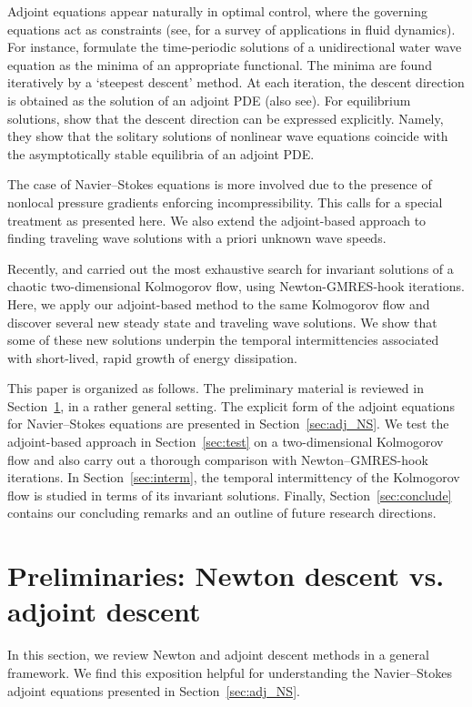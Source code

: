 \documentclass{article}
\begin{document}
Adjoint equations appear naturally in optimal control, where the governing equations
act as constraints (see, for a survey of applications in fluid dynamics). 
For instance, formulate the
time-periodic solutions of a unidirectional water wave equation
as the minima of an appropriate functional. The minima are found 
iteratively by
a `steepest descent' method.
At each iteration,
the descent direction is obtained as the solution of an adjoint PDE (also see).
For equilibrium solutions, show that the descent direction can be expressed explicitly.
Namely, they show that the solitary solutions of nonlinear wave equations coincide with the asymptotically stable equilibria of 
an adjoint PDE.

The case of
Navier--Stokes equations is more involved due to
the presence of nonlocal pressure
gradients enforcing incompressibility. This calls for a special treatment
as presented here. We also extend the adjoint-based approach to finding
traveling wave solutions with a priori unknown wave speeds.

Recently, and carried out the most exhaustive search for invariant solutions
of a chaotic two-dimensional Kolmogorov flow, using Newton-GMRES-hook iterations.
Here, we apply our adjoint-based method to the same Kolmogorov flow and discover several
new steady state and traveling wave solutions. We show that some of these new
solutions underpin the temporal intermittencies associated with
short-lived, rapid growth of energy dissipation. 

This paper is organized as follows. The preliminary material is reviewed in
Section~\ref{sec:prelim}, in a rather general setting. The explicit form of the
adjoint equations for Navier--Stokes equations are presented in
Section~\ref{sec:adj_NS}. We test the adjoint-based approach in Section~\ref{sec:test}
on a two-dimensional Kolmogorov flow
and also carry out a thorough comparison with Newton--GMRES-hook iterations.
In Section~\ref{sec:interm}, the temporal intermittency of the Kolmogorov flow is
studied in terms of its invariant solutions. Finally, Section~\ref{sec:conclude} contains
our concluding remarks and an outline of future research directions.




\section{Preliminaries: Newton descent vs. adjoint descent}\label{sec:prelim}
In this section, we review Newton and adjoint descent methods
in a general framework.
We find this exposition helpful for
understanding the Navier--Stokes adjoint
equations presented in Section~\ref{sec:adj_NS}.
\end{document}
